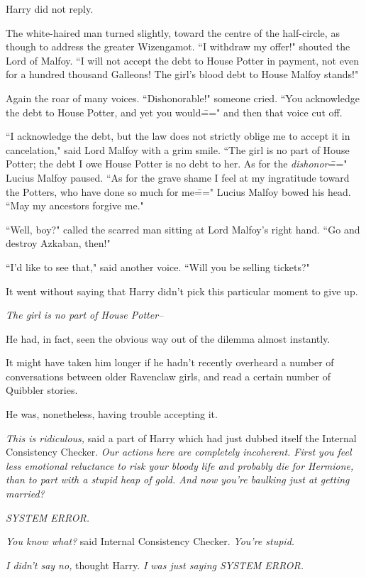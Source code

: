Harry did not reply.

The white-haired man turned slightly, toward the centre of the half-circle, as though to address the greater Wizengamot. ``I withdraw my offer!" shouted the Lord of Malfoy. ``I will not accept the debt to House Potter in payment, not even for a hundred thousand Galleons! The girl's blood debt to House Malfoy stands!"

Again the roar of many voices. ``Dishonorable!" someone cried. ``You acknowledge the debt to House Potter, and yet you would\===" and then that voice cut off.

``I acknowledge the debt, but the law does not strictly oblige me to accept it in cancelation," said Lord Malfoy with a grim smile. ``The girl is no part of House Potter; the debt I owe House Potter is no debt to her. As for the \emph{dishonor}\===" Lucius Malfoy paused. ``As for the grave shame I feel at my ingratitude toward the Potters, who have done so much for me\===" Lucius Malfoy bowed his head. ``May my ancestors forgive me."

``Well, boy?" called the scarred man sitting at Lord Malfoy's right hand. ``Go and destroy Azkaban, then!"

``I'd like to see that," said another voice. ``Will you be selling tickets?"

It went without saying that Harry didn't pick this particular moment to give up.

\emph{The girl is no part of House Potter\---}

He had, in fact, seen the obvious way out of the dilemma almost instantly.

It might have taken him longer if he hadn't recently overheard a number of conversations between older Ravenclaw girls, and read a certain number of Quibbler stories.

He was, nonetheless, having trouble accepting it.

\emph{This is ridiculous,} said a part of Harry which had just dubbed itself the Internal Consistency Checker. \emph{Our actions here are completely incoherent. First you feel less emotional reluctance to risk your bloody \emph{life} and probably \emph{die} for Hermione, than to part with a stupid heap of gold. And now you're baulking just at getting married?}

\emph{SYSTEM ERROR.}

\emph{You know what?} said Internal Consistency Checker. \emph{You're stupid.}

\emph{I didn't say no,} thought Harry. \emph{I was just saying SYSTEM ERROR.}

